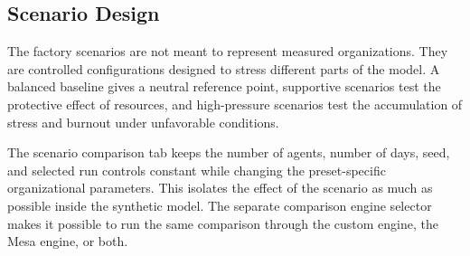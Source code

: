 \documentclass[12pt,a4paper]{article}
\begin{document}
\subsection{Scenario Design}

The factory scenarios are not meant to represent measured organizations. They are controlled configurations designed to stress different parts of the model. A balanced baseline gives a neutral reference point, supportive scenarios test the protective effect of resources, and high-pressure scenarios test the accumulation of stress and burnout under unfavorable conditions.

\begin{table}[ht]
    \centering
    \caption{Scenario design logic used by the AWDS presets.}
\end{table}

The scenario comparison tab keeps the number of agents, number of days, seed, and selected run controls constant while changing the preset-specific organizational parameters. This isolates the effect of the scenario as much as possible inside the synthetic model. The separate comparison engine selector makes it possible to run the same comparison through the custom engine, the Mesa engine, or both.
\end{document}

